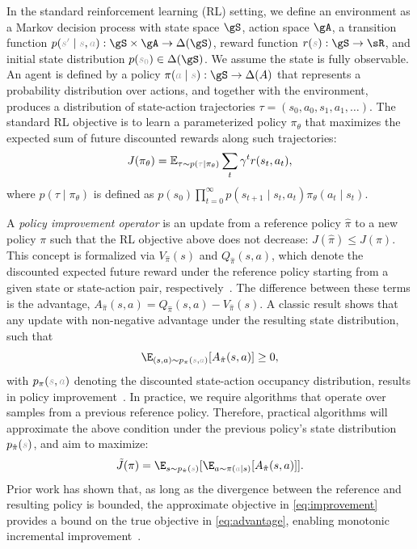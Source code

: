 \documentclass{article}
\newcommand{\pl}[1]{{\color{plgray} #1}}
\begin{document}
In the standard reinforcement learning (RL) setting, we define an environment as a Markov decision process with state space $\gS$, action space $\gA$, a transition function $p(\pl{s'} \mid \pl{s}, \pl{a}): \gS \times \gA \to \Delta(\gS)$, reward function $r(\pl{s}): \gS \to \sR$, and initial state distribution $p(\pl{s_0}) \in \Delta(\gS)$. We assume the state is fully observable. An agent is defined by a policy $\pi(\pl{a} \mid \pl{s}): \gS \to \Delta(A)$ that represents a probability distribution over actions, and together with the environment, produces a distribution of state-action trajectories $\tau = (s_0, a_0, s_1, a_1, \ldots)$. The standard RL objective is to learn a parameterized policy $\pi_\theta$ that maximizes the expected sum of future discounted rewards along such trajectories:
\begin{equation}
    J(\pi_\theta) = \mathbb{E}_{\tau \sim p(\pl{\tau} \mid \pi_\theta)}  \sum_t \gamma^t r(s_t, a_t),
    \label{equation:rl}
\end{equation}
where $p(\tau \mid \pi_\theta)$ is defined as $p(s_0) \prod_{t=0}^\infty p(s_{t+1} \mid s_t, a_t) \pi_\theta(a_t \mid s_t)$.

A \textit{policy improvement operator} is an update from
a reference policy $\hat{\pi}$ to a new policy $\pi$
such that the RL objective above does not decrease:
$J(\hat \pi) \leq J(\pi)$.
This concept is formalized via $V_{\hat{\pi}}(s)$ and $Q_{\hat{\pi}}(s,a)$, which denote the discounted expected future reward under the reference policy starting from a given state or state-action pair, respectively~\citep{rl_sutton2005}. The difference between these terms is the advantage, $A_{\hat{\pi}}(s,a) = Q_{\hat{\pi}}(s, a) - V_{\hat{\pi}}(s)$. A classic result shows that any update with non-negative advantage under the resulting state distribution, such that
\begin{equation}
   \E_{(s, a) \sim p_\pi(\pl{s}, \pl{a})} [A_{\hat{\pi}}(s,a)] \geq 0,
   \label{eq:advantage}
\end{equation}
with $p_\pi(\pl{s}, \pl{a})$ denoting the discounted state-action occupancy distribution,
results in policy improvement~\citep{trpo_schulman2015}. In practice, we require algorithms that operate over samples from a previous reference policy. Therefore, practical algorithms will approximate the above condition under the previous policy's state distribution $p_{\hat{\pi}}(\pl{s})$, and aim to maximize:
\begin{equation}
   \tilde{J}(\pi) =\E_{s \sim p_{\hat \pi}(\pl{s})}[ \E_{a \sim \pi(\pl{a} \mid s)}[ A_{\hat{\pi}}(s,a) ]].
   \label{eq:improvement}
\end{equation}
Prior work has shown that, as long as the divergence between the reference and resulting policy is bounded, the approximate objective in \cref{eq:improvement} provides a bound on the true objective in \cref{eq:advantage}, enabling monotonic incremental improvement~\citep{trpo_schulman2015}.
\end{document}
